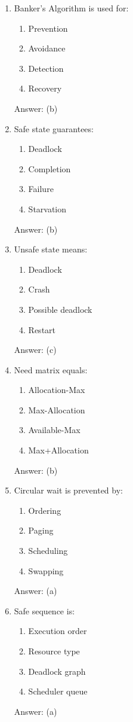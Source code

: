 \begin{enumerate}
\item Banker's Algorithm is used for:
\begin{enumerate}[label=(\alph*)]
\item Prevention
\item Avoidance
\item Detection
\item Recovery
\end{enumerate}
Answer: (b)

\item Safe state guarantees:
\begin{enumerate}[label=(\alph*)]
\item Deadlock
\item Completion
\item Failure
\item Starvation
\end{enumerate}
Answer: (b)

\item Unsafe state means:
\begin{enumerate}[label=(\alph*)]
\item Deadlock
\item Crash
\item Possible deadlock
\item Restart
\end{enumerate}
Answer: (c)

\item Need matrix equals:
\begin{enumerate}[label=(\alph*)]
\item Allocation-Max
\item Max-Allocation
\item Available-Max
\item Max+Allocation
\end{enumerate}
Answer: (b)

\item Circular wait is prevented by:
\begin{enumerate}[label=(\alph*)]
\item Ordering
\item Paging
\item Scheduling
\item Swapping
\end{enumerate}
Answer: (a)

\item Safe sequence is:
\begin{enumerate}[label=(\alph*)]
\item Execution order
\item Resource type
\item Deadlock graph
\item Scheduler queue
\end{enumerate}
Answer: (a)


\end{enumerate}
